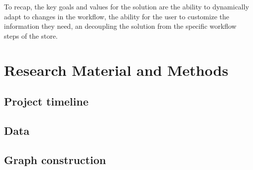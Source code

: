 \documentclass[english,12pt,a4paper,pdftex,sci,utf8]{aaltothesis}
\begin{document}

To recap, the key goals and values for the solution are the ability to dynamically adapt to changes in the workflow,
the ability for the user to customize the information they need, an decoupling the solution from the specific 
workflow steps of the store.


\clearpage
\section{Research Material and Methods}
\label{sec:methods}


\subsection{Project timeline}
\label{sec:timeline}



\subsection{Data}



\subsection{Graph construction}
\end{document}
